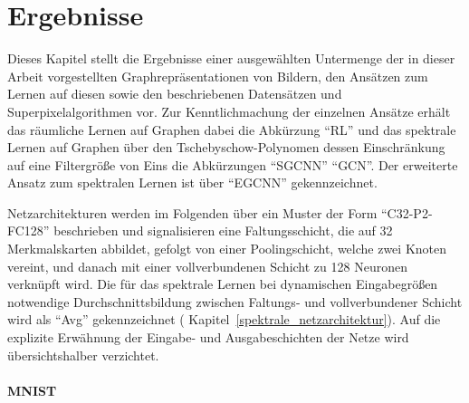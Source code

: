 \section{Ergebnisse}
\label{ergebnisse}

Dieses Kapitel stellt die Ergebnisse einer ausgewählten Untermenge der in dieser Arbeit vorgestellten Graphrepräsentationen von Bildern, den Ansätzen zum Lernen auf diesen sowie den beschriebenen Datensätzen und Superpixelalgorithmen vor.
Zur Kenntlichmachung der einzelnen Ansätze erhält das räumliche Lernen auf Graphen dabei die Abkürzung \enquote{\acs{RL}} und das spektrale Lernen auf Graphen über den Tschebyschow-Polynomen \bzw{} dessen Einschränkung auf eine Filtergröße von Eins die Abkürzungen \enquote{\acs{SGCNN}} \bzw{} \enquote{\acs{GCN}}.
Der erweiterte Ansatz zum spektralen Lernen ist über \enquote{\acs{EGCNN}} gekennzeichnet.

Netzarchitekturen werden im Folgenden \bspw{} über ein Muster der Form \enquote{C32-P2-FC128} beschrieben und signalisieren eine Faltungsschicht, die auf 32 Merkmalskarten abbildet, gefolgt von einer Poolingschicht, welche zwei Knoten vereint, und danach mit einer vollverbundenen Schicht zu 128 Neuronen verknüpft wird.
Die für das spektrale Lernen bei dynamischen Eingabegrößen notwendige Durchschnittsbildung zwischen Faltungs- und vollverbundener Schicht wird als \enquote{Avg} gekennzeichnet (\vgl{} Kapitel~\ref{spektrale_netzarchitektur}).
Auf die explizite Erwähnung der Eingabe- und Ausgabeschichten der Netze wird übersichtshalber verzichtet.

\paragraph{\gls{MNIST}}

